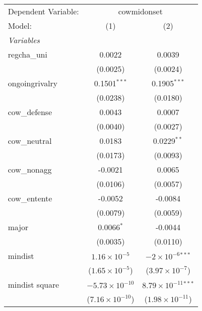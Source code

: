 \begingroup
\centering
\begin{tabular}{lcc}
   \tabularnewline \midrule \midrule
   Dependent Variable: & \multicolumn{2}{c}{cowmidonset}\\
   Model:                                & (1)                      & (2)\\  
   \midrule
   \emph{Variables}\\
   regcha\_uni                           & 0.0022                   & 0.0039\\   
                                         & (0.0025)                 & (0.0024)\\   
   ongoingrivalry                        & 0.1501$^{***}$           & 0.1905$^{***}$\\   
                                         & (0.0238)                 & (0.0180)\\   
   cow\_defense                          & 0.0043                   & 0.0007\\   
                                         & (0.0040)                 & (0.0027)\\   
   cow\_neutral                          & 0.0183                   & 0.0229$^{**}$\\   
                                         & (0.0173)                 & (0.0093)\\   
   cow\_nonagg                           & -0.0021                  & 0.0065\\   
                                         & (0.0106)                 & (0.0057)\\   
   cow\_entente                          & -0.0052                  & -0.0084\\   
                                         & (0.0079)                 & (0.0059)\\   
   major                                 & 0.0066$^{*}$             & -0.0044\\   
                                         & (0.0035)                 & (0.0110)\\   
   mindist                               & $1.16\times 10^{-5}$     & $-2\times 10^{-6}$$^{***}$\\    
                                         & ($1.65\times 10^{-5}$)   & ($3.97\times 10^{-7}$)\\    
   mindist square                        & $-5.73\times 10^{-10}$   & $8.79\times 10^{-11}$$^{***}$\\    
                                         & ($7.16\times 10^{-10}$)  & ($1.98\times 10^{-11}$)\\    

\end{tabular}
